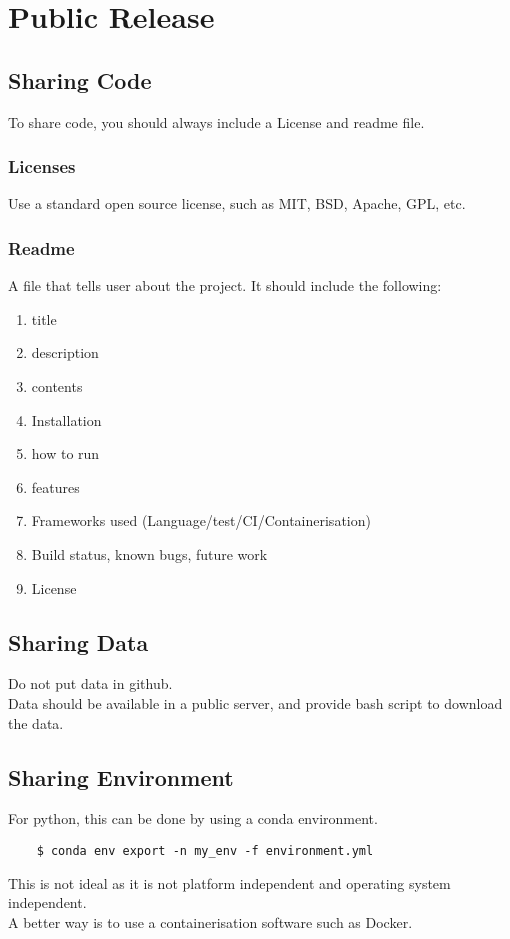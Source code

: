 \documentclass[12pt,a4paper]{article}
\begin{document}
\section{Public Release}
\subsection{Sharing Code}
To share code, you should always include a License and readme file.
\subsubsection{Licenses}
Use a standard open source license, such as MIT, BSD, Apache, GPL, etc.\\
\subsubsection{Readme}
A file that tells user about the project. It should include the following:
\begin{enumerate}
    \item title
    \item description
    \item contents
    \item Installation
    \item how to run
    \item features
    \item Frameworks used (Language/test/CI/Containerisation)
    \item Build status, known bugs, future work
    \item License
\end{enumerate}

\subsection{Sharing Data}
Do not put data in github.\\
Data should be available in a public server, and provide bash script to download the data.\\ 

\subsection{Sharing Environment}
For python, this can be done by using a conda environment.\\
\begin{lstlisting}
    $ conda env export -n my_env -f environment.yml
\end{lstlisting}
This is not ideal as it is not platform independent and operating system independent.\\
A better way is to use a containerisation software such as Docker.\\
\end{document}
